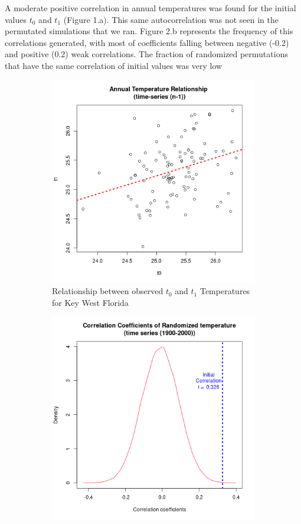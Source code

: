 \documentclass[12pt]{article}
\begin{document}
  A moderate positive correlation in annual temperatures was found for the initial values $t_0$ and $t_1$  (Figure 1.a). 
  This same autocorrelation was not seen in the permutated simulations that we ran. 
  Figure 2.b represents the frequency of this correlations generated, with most of coefficients falling between negative (-0.2) and positive (0.2) weak correlations.
  The fraction of randomized permutations that have the same correlation of initial values was very low 



    \begin{figure}[H]
      \centering
      \begin{subfigure}{.45\textwidth}
        \centering
        \includegraphics[width=.75\linewidth]{../results/Florida_Temperatures_relationship.png}
        \caption{Relationship between observed $t_0$ and $t_1$ Temperatures for Key West Florida}
        \label{fig:sub1}
      \end{subfigure}
      \begin{subfigure}{.45\textwidth}
        \centering
        \includegraphics[width=.75\linewidth]{../results/Florida_Temperatures_cor_density.png}

\end{subfigure}
\end{figure}
\end{document}
